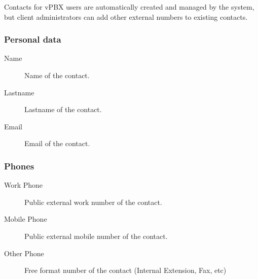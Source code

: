 \documentclass[letterpaper,10pt,spanish]{sphinxmanual}
\begin{document}
Contacts for vPBX users are automatically created and managed by the system,
but client administrators can add other external numbers to existing contacts.


\subsubsection{Personal data}
\label{administration_portal/client/vpbx/addressbook:personal-data}\begin{description}
\item[{Name}] \leavevmode{}\label{administration_portal/client/vpbx/addressbook:term-name}
Name of the contact.

\item[{Lastname}] \leavevmode{}\label{administration_portal/client/vpbx/addressbook:term-lastname}
Lastname of the contact.

\item[{Email}] \leavevmode{}\label{administration_portal/client/vpbx/addressbook:term-email}
Email of the contact.

\end{description}


\subsubsection{Phones}
\label{administration_portal/client/vpbx/addressbook:phones}\begin{description}
\item[{Work Phone}] \leavevmode{}\label{administration_portal/client/vpbx/addressbook:term-work-phone}
Public external work number of the contact.

\item[{Mobile Phone}] \leavevmode{}\label{administration_portal/client/vpbx/addressbook:term-mobile-phone}
Public external mobile number of the contact.

\item[{Other Phone}] \leavevmode{}\label{administration_portal/client/vpbx/addressbook:term-other-phone}
Free format number of the contact (Internal Extension, Fax, etc)

\end{description}
\end{document}
